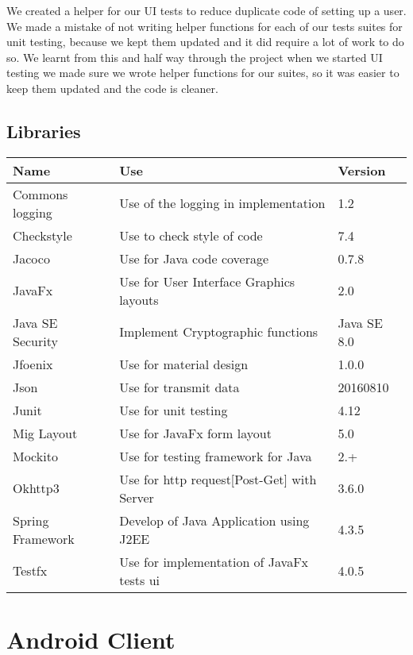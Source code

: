 \documentclass[11pt,a4paper]{report}
\begin{document}
We created a helper for our UI tests to reduce duplicate code of setting up a user. We made a mistake of not writing helper functions for each of our tests suites for unit testing, because we kept them updated and it did require a lot of work to do so. We learnt from this and half way through the project when we started UI testing we made sure we wrote helper functions for our suites, so it was easier to keep them updated and the code is cleaner.



\subsection{Libraries}

\begin{tabular}{| l | l | l |}
  \hline
  Name & Use & Version \\
  \hline
  Commons logging & Use of the logging in implementation & 1.2\\
  Checkstyle & Use to check style of code & 7.4\\
  Jacoco & Use for Java code coverage & 0.7.8\\
  JavaFx & Use for User Interface Graphics layouts & 2.0\\
  Java SE Security & Implement Cryptographic functions & Java SE 8.0\\
  Jfoenix & Use for material design & 1.0.0\\
  Json & Use for transmit data & 20160810\\
  Junit & Use for unit testing & 4.12\\
  Mig Layout & Use for JavaFx form layout & 5.0\\
  Mockito & Use for testing framework for Java & 2.+\\
  Okhttp3 & Use for http request[Post-Get] with Server  & 3.6.0\\
  Spring Framework & Develop of Java Application using J2EE & 4.3.5\\
  Testfx & Use for implementation of JavaFx tests ui  & 4.0.5\\
  \hline
\end{tabular}

\section{Android Client}
\end{document}

